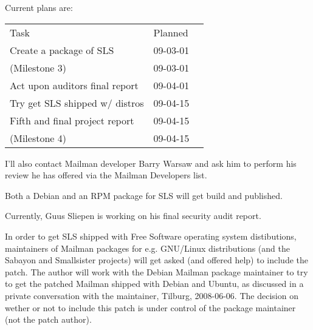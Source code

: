 \documentclass[a4]{article}
\begin{document}
Current plans are:

\begin{tabular}{lll}
 Task                            & Planned  \\ \cline{1-2}
 Create a package of SLS         & 09-03-01 \\
 (Milestone 3)                   & 09-03-01 \\
 Act upon auditors final report  & 09-04-01 \\
 Try get SLS shipped w/ distros  & 09-04-15 \\
 Fifth and final project report  & 09-04-15 \\
 (Milestone 4)                   & 09-04-15 \\
\end{tabular}

I'll also contact Mailman developer Barry Warsaw and ask him to perform his
review he has offered via the Mailman Developers list.

Both a Debian and an RPM package for SLS will get build and published.

Currently, Guus Sliepen is working on his final security audit report.

In order to get SLS shipped with Free Software operating system distibutions,
maintainers of Mailman packages for e.g. GNU/Linux distributions (and the
Sabayon and Smallsister projects) will get asked (and offered help) to include
the patch.  The author will work with the Debian Mailman package maintainer to
try to get the patched Mailman shipped with Debian and Ubuntu, as discussed in
a private conversation with the maintainer, Tilburg, 2008-06-06.  The decision
on wether or not to include this patch is under control of the package
maintainer (not the patch author).
\end{document}
